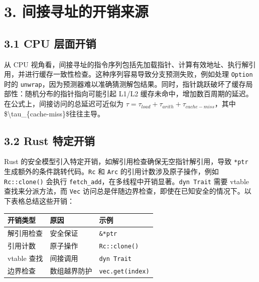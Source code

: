 \chapter{3. 间接寻址的开销来源}
\section{3.1 CPU 层面开销}
从 CPU 视角看，间接寻址的指令序列包括先加载指针、计算有效地址、执行解引用，并进行缓存一致性检查。这种序列容易导致分支预测失败，例如处理 \texttt{Option} 时的 \texttt{unwrap}，因为预测器难以准确猜测解包结果。同时，指针跳跃破坏了缓存局部性：随机分布的指针指向可能引起 L1/L2 缓存未命中，增加数百周期的延迟。在公式上，间接访问的总延迟可近似为 $\tau = \tau_{load} + \tau_{arith} + \tau_{cache-miss}$，其中\${}\textbackslash{}tau\_{}\{{}cache-miss\}{}\${}往往主导。\par
\section{3.2 Rust 特定开销}
Rust 的安全模型引入特定开销，如解引用检查确保无空指针解引用，导致 \texttt{*ptr} 生成额外的条件跳转代码。\texttt{Rc} 和 \texttt{Arc} 的引用计数涉及原子操作，例如 \texttt{Rc::clone()} 会执行 \texttt{fetch\_{}add}，在多线程中开销显著。\texttt{dyn Trait} 需要 vtable 查找来分派方法，而 \texttt{Vec} 访问总是伴随边界检查，即使在已知安全的情况下。以下表格总结这些开销：\par
\begin{table}[H]
\centering
\begin{tabular}{|l|l|l|}
\hline
开销类型 & 原因 & 示例 \\
\hline
解引用检查 & 安全保证 & \texttt{\&{}*ptr} \\
\hline
引用计数 & 原子操作 & \texttt{Rc::clone()} \\
\hline
vtable 查找 & 间接调用 & \texttt{dyn Trait} \\
\hline
边界检查 & 数组越界防护 & \texttt{vec.get(index)} \\
\hline
\end{tabular}
\end{table}
